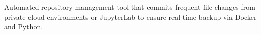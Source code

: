 \documentclass[]{dhirendra-pratap-singh-resume}
\begin{document}
\begin{minipage}[t]{0.66\textwidth}
\href{https://github.com/hanisntsolo/auto-committer}{}
\begin{tightemize}
\item Automated repository management tool that commits frequent file changes from private cloud environments or JupyterLab to ensure real-time backup via Docker and Python.
\end{tightemize}








\end{minipage}
\end{document}
